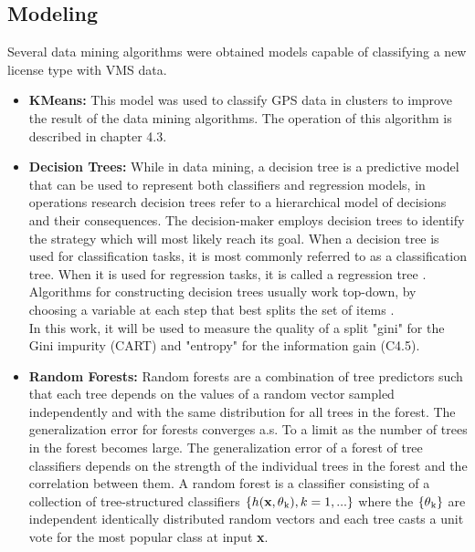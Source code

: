 \subsection{Modeling} %
\label{sub:modeling}
Several data mining algorithms were obtained models capable of classifying a new license type with VMS data.
\begin{itemize}
\item \textbf{ KMeans:} This model was used to classify GPS data in clusters to improve the result of the data mining algorithms. The operation of this algorithm is described in chapter 4.3.

\item \textbf{ Decision Trees: }
While in data mining, a decision tree is a predictive model that can be used to represent both classifiers and regression models, in operations research decision trees refer to a hierarchical model of decisions and their consequences\cite{Rokach2014}. The decision-maker employs decision trees to identify the strategy which will most likely reach its goal. When a decision tree is used for classification tasks, it is most commonly referred to as a classification tree. When it is used for regression tasks, it is called a regression tree \cite{Rokach2014}.
Algorithms for constructing decision trees usually work top-down, by choosing a variable at each step that best splits the set of items \cite{ApplicationsReviews}.\\
In this work, it will be used to measure the quality of a split "gini" for the Gini impurity (CART)\cite{DTAnalysis} and "entropy" for the information gain (C4.5)\cite{DTAnalysis}.

\item \textbf{ Random Forests: }
Random forests are a combination of tree predictors such that each tree depends on the values of a random vector sampled independently and with the same distribution for all trees in the forest\cite{Breiman2001}. The generalization error for forests converges a.s. To a limit as the number of trees in the forest becomes large. The generalization error of a forest of tree classifiers depends on the strength of the individual trees in the forest and the correlation between them.
A random forest is a classifier consisting of a collection of tree-structured
classifiers \(\{h(\textbf{x}, \theta \textsubscript{k} ), k = 1,...\}\) where the \( \{ \theta \textsubscript{k} \}\) are independent identically distributed
random vectors and each tree casts a unit vote for the most popular class at input \textbf{x}\cite{Breiman2001}.



\end{itemize}
